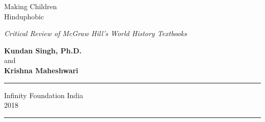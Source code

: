 \thispagestyle{empty}
\begin{center}
{\fontsize{28}{30}\selectfont Making Children\\[12pt] Hinduphobic}\\[10pt]

\bigskip

{\sl Critical Review of McGraw Hill’s World History Textbooks}

\vfill


{\fontsize{14}{18}\selectfont 
\textbf{Kundan Singh, Ph.D.}\\[2pt]
and\\[5pt]
\textbf{Krishna Maheshwari}
}
\vfill




\rule{5cm}{1pt}

{\fontsize{12}{14}\selectfont
Infinity Foundation India\\[4pt]
2018}

\rule{5cm}{1pt}
\end{center}




